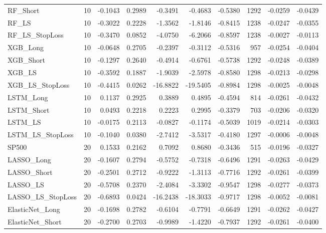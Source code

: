 \begin{tabular}{llrrrrrrrr}
\cline{1-10}
RF\_Short & 10 & -0.1043 & 0.2989 & -0.3491 & -0.4683 & -0.5380 & 1292 & -0.0259 & -0.0439 \\
\cline{1-10}
RF\_LS & 10 & -0.3022 & 0.2228 & -1.3562 & -1.8146 & -0.8415 & 1238 & -0.0247 & -0.0355 \\
\cline{1-10}
RF\_LS\_StopLoss & 10 & -0.3470 & 0.0852 & -4.0750 & -6.2066 & -0.8597 & 1238 & -0.0027 & -0.0113 \\
\cline{1-10}
XGB\_Long & 10 & -0.0648 & 0.2705 & -0.2397 & -0.3112 & -0.5316 & 957 & -0.0254 & -0.0404 \\
\cline{1-10}
XGB\_Short & 10 & -0.1297 & 0.2640 & -0.4914 & -0.6761 & -0.5738 & 1292 & -0.0248 & -0.0389 \\
\cline{1-10}
XGB\_LS & 10 & -0.3592 & 0.1887 & -1.9039 & -2.5978 & -0.8580 & 1298 & -0.0213 & -0.0298 \\
\cline{1-10}
XGB\_LS\_StopLoss & 10 & -0.4415 & 0.0262 & -16.8822 & -19.5405 & -0.8984 & 1298 & -0.0025 & -0.0048 \\
\cline{1-10}
LSTM\_Long & 10 & 0.1137 & 0.2925 & 0.3889 & 0.4895 & -0.4594 & 814 & -0.0261 & -0.0432 \\
\cline{1-10}
LSTM\_Short & 10 & 0.0493 & 0.2218 & 0.2223 & 0.2995 & -0.3379 & 703 & -0.0206 & -0.0320 \\
\cline{1-10}
LSTM\_LS & 10 & -0.0175 & 0.2113 & -0.0827 & -0.1174 & -0.5039 & 1019 & -0.0214 & -0.0303 \\
\cline{1-10}
LSTM\_LS\_StopLoss & 10 & -0.1040 & 0.0380 & -2.7412 & -3.5317 & -0.4180 & 1297 & -0.0006 & -0.0048 \\
\cline{1-10}
SP500 & 20 & 0.1533 & 0.2162 & 0.7092 & 0.8680 & -0.3436 & 515 & -0.0196 & -0.0327 \\
\cline{1-10}
LASSO\_Long & 20 & -0.1607 & 0.2794 & -0.5752 & -0.7318 & -0.6496 & 1291 & -0.0263 & -0.0429 \\
\cline{1-10}
LASSO\_Short & 20 & -0.2501 & 0.2712 & -0.9222 & -1.3113 & -0.7716 & 1292 & -0.0261 & -0.0399 \\
\cline{1-10}
LASSO\_LS & 20 & -0.5708 & 0.2370 & -2.4084 & -3.3302 & -0.9547 & 1298 & -0.0277 & -0.0373 \\
\cline{1-10}
LASSO\_LS\_StopLoss & 20 & -0.6893 & 0.0424 & -16.2438 & -18.3033 & -0.9717 & 1298 & -0.0052 & -0.0081 \\
\cline{1-10}
ElasticNet\_Long & 20 & -0.1698 & 0.2782 & -0.6104 & -0.7791 & -0.6649 & 1291 & -0.0262 & -0.0427 \\
\cline{1-10}
ElasticNet\_Short & 20 & -0.2700 & 0.2703 & -0.9989 & -1.4220 & -0.7937 & 1292 & -0.0261 & -0.0400 \\

\end{tabular}
